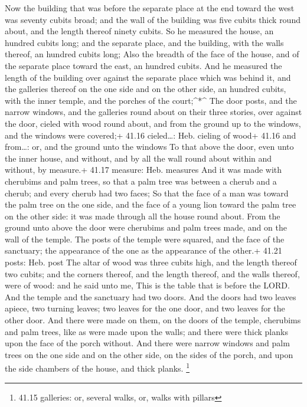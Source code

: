  Now the building that was before the separate place at the
end toward the west was seventy cubits broad; and the wall of the
building was five cubits thick round about, and the length thereof
ninety cubits.  So he measured the house, an hundred cubits
long; and the separate place, and the building, with the walls thereof,
an hundred cubits long;  Also the breadth of the face of
the house, and of the separate place toward the east, an hundred cubits.
 And he measured the length of the building over against
the separate place which was behind it, and the galleries thereof on the
one side and on the other side, an hundred cubits, with the inner
temple, and the porches of the court;\^{}*\^{}  The door
posts, and the narrow windows, and the galleries round about on their
three stories, over against the door, cieled with wood round about, and
from the ground up to the windows, and the windows were covered;+ 41.16
cieled\ldots: Heb. cieling of wood+ 41.16 and from\ldots: or, and the
ground unto the windows  To that above the door, even unto
the inner house, and without, and by all the wall round about within and
without, by measure.+ 41.17 measure: Heb. measures  And it
was made with cherubims and palm trees, so that a palm tree was between
a cherub and a cherub; and every cherub had two faces;  So
that the face of a man was toward the palm tree on the one side, and the
face of a young lion toward the palm tree on the other side: it was made
through all the house round about.  From the ground unto
above the door were cherubims and palm trees made, and on the wall of
the temple.  The posts of the temple were squared, and the
face of the sanctuary; the appearance of the one as the appearance of
the other.+ 41.21 posts: Heb. post  The altar of wood was
three cubits high, and the length thereof two cubits; and the corners
thereof, and the length thereof, and the walls thereof, were of wood:
and he said unto me, This is the table that is before the LORD.
 And the temple and the sanctuary had two doors.
 And the doors had two leaves apiece, two turning leaves;
two leaves for the one door, and two leaves for the other door.
 And there were made on them, on the doors of the temple,
cherubims and palm trees, like as were made upon the walls; and there
were thick planks upon the face of the porch without.  And
there were narrow windows and palm trees on the one side and on the
other side, on the sides of the porch, and upon the side chambers of the
house, and thick planks. \footnote{41.15 galleries: or, several walks,
  or, walks with pillars}

